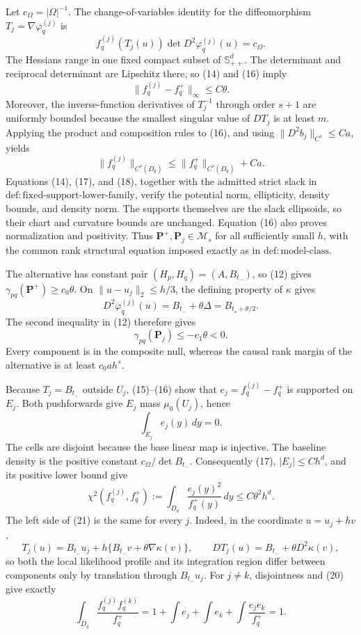 Let \(c_\Omega=\lvert\Omega\rvert^{-1}\).  The change-of-variables identity for the diffeomorphism \(T_j=\nabla\varphi_q^{(j)}\) is
\[
 f_q^{(j)}(T_j(u))\det D^2\varphi_q^{(j)}(u)=c_\Omega.
 \tag{16}
\]
The Hessians range in one fixed compact subset of \(\mathbb S_{++}^d\).  The determinant and reciprocal determinant are Lipschitz there, so (14) and (16) imply
\[
 \lVert f_q^{(j)}-f_q^+\rVert_\infty\le C\theta.
 \tag{17}
\]
Moreover, the inverse-function derivatives of \(T_j^{-1}\) through order \(s+1\) are uniformly bounded because the smallest singular value of \(DT_j\) is at least \(m\).  Applying the product and composition rules to (16), and using \(\lVert D^2b_j\rVert_{C^s}\le Ca\), yields
\[
 \lVert f_q^{(j)}\rVert_{C^s(D_q)}
 \le\lVert f_q^+\rVert_{C^s(D_q)}+Ca.
 \tag{18}
\]
Equations (14), (17), and (18), together with the admitted strict slack in \(\mathrm{def:fixed\text{-}support\text{-}lower\text{-}family}\), verify the potential norm, ellipticity, density bounds, and density norm.  The supports themselves are the slack ellipsoids, so their chart and curvature bounds are unchanged.  Equation (16) also proves normalization and positivity.  Thus \(\mathbf P^+,\mathbf P_j\in\mathcal M_s\) for all sufficiently small \(h\), with the common rank structural equation imposed exactly as in \(\mathrm{def:model\text{-}class}\).

The alternative has constant pair \((H_p,H_q)=(A,B_{t_-})\), so (12) gives \(\gamma_{pq}(\mathbf P^+)\ge c_0\theta\).  On \(\lVert u-u_j\rVert_2\le h/3\), the defining property of \(\kappa\) gives
\[
 D^2\varphi_q^{(j)}(u)=B_{t_-}+\theta\Delta
 =B_{t_\star+\theta/2}.
\]
The second inequality in (12) therefore gives
\[
 \gamma_{pq}(\mathbf P_j)\le-c_1\theta<0.
 \tag{19}
\]
Every component is in the composite null, whereas the causal rank margin of the alternative is at least \(c_0ah^s\).

Because \(T_j=B_{t_-}\) outside \(U_j\), (15)--(16) show that \(e_j=f_q^{(j)}-f_q^+\) is supported on \(E_j\).  Both pushforwards give \(E_j\) mass \(\mu_0(U_j)\), hence
\[
 \int_{E_j}e_j(y)\,dy=0.
 \tag{20}
\]
The cells are disjoint because the base linear map is injective.  The baseline density is the positive constant \(c_\Omega/\det B_{t_-}\).  Consequently (17), \(\lvert E_j\rvert\le Ch^d\), and its positive lower bound give
\[
 \chi^2(f_q^{(j)},f_q^+)
 :=\int_{D_q}\frac{e_j(y)^2}{f_q^+(y)}\,dy
 \le C\theta^2h^d.
 \tag{21}
\]
The left side of (21) is the same for every \(j\).  Indeed, in the coordinate \(u=u_j+hv\),
\[
 T_j(u)=B_{t_-}u_j+h\{B_{t_-}v+\theta\nabla\kappa(v)\},
 \qquad
 DT_j(u)=B_{t_-}+\theta D^2\kappa(v),
\]
so both the local likelihood profile and its integration region differ between components only by translation through \(B_{t_-}u_j\).  For \(j\ne k\), disjointness and (20) give exactly
\[
 \int_{D_q}\frac{f_q^{(j)}f_q^{(k)}}{f_q^+}
 =1+\int e_j+\int e_k+\int\frac{e_je_k}{f_q^+}=1.
 \tag{22}
\]

